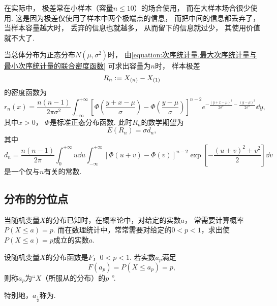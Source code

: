 在实际中，
极差常在小样本（容量\(n\leq10\)）的场合使用，
而在大样本场合很少使用.
这是因为极差仅使用了样本中两个极端点的信息，
而把中间的信息都丢弃了，
当样本容量越大时，
丢弃的信息也就越多，
从而留下的信息就过少，
其使用价值就不大了.

当总体分布为正态分布\(N(\mu,\sigma^2)\)时，
由\cref{equation:次序统计量.最大次序统计量与最小次序统计量的联合密度函数}
可求出容量为\(n\)时，
样本极差
\begin{equation}
	R_n
	:=
	X_{(n)} - X_{(1)}
\end{equation}
的密度函数为
\begin{equation}
	r_n(x)
	= \frac{n(n-1)}{2\pi\sigma^2}
	\int_{-\infty}^{+\infty} \left[
		\Phi\left(
			\frac{y+x-\mu}{\sigma}
		\right)
		- \Phi\left(
			\frac{y-\mu}{\sigma}
		\right)
	\right]^{n-2}
	e^{
		-\frac{(y+x-\mu)^2}{2\sigma^2}
		-\frac{(y-\mu)^2}{2\sigma^2}
	}
	\dd{y},
\end{equation}
其中\(x>0\)，
\(\Phi\)是标准正态分布函数.
此时\(R_n\)的数学期望为
\begin{equation}
	E(R_n)
	= \sigma d_n,
\end{equation}
其中\begin{equation*}
	d_n
	= \frac{n(n-1)}{2\pi}
	\int_0^{+\infty} u \dd{u}
	\int_{-\infty}^{+\infty}
	[\Phi(u+v) - \Phi(v)]^{n-2}
	\exp[
		-\frac{(u+v)^2+v^2}{2}
	]
	\dd{v}
\end{equation*}是一个仅与\(n\)有关的常数.

\subsection{分布的分位点}
当随机变量\(X\)的分布已知时，在概率论中，对给定的实数\(a\)，
常需要计算概率\(P(X \leq a) = p\).
而在数理统计中，常常需要对给定的\(0<p<1\)，求出使\(P(X \leq a) = p\)成立的实数\(a\).

\begin{definition}
设随机变量\(X\)的分布函数是\(F\)，\(0<p<1\).
若实数\(a_p\)满足\begin{equation}
	F(a_p) = P(X \leq a_p) = p,
\end{equation}
则称\(a_p\)为“\(X\)（所服从的分布）的\(p\) ”.

特别地，\(a_{\frac{1}{2}}\)称为.
\end{definition}

